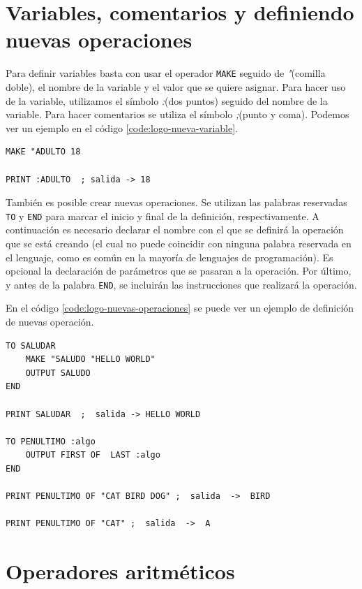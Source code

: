 \section{Variables, comentarios y definiendo nuevas operaciones}
\label{sec:logo-variables}

Para definir variables basta con usar el operador \texttt{MAKE} seguido de \emph{"}(comilla doble), el nombre de la variable y el valor que se quiere asignar. Para hacer uso de la variable, utilizamos el símbolo \emph{:}(dos puntos) seguido del nombre de la variable. Para hacer comentarios se utiliza el símbolo \emph{;}(punto y coma). Podemos ver un ejemplo en el código \ref{code:logo-nueva-variable}.

\begin{lstlisting}[language={Logo}, label={code:logo-nueva-variable}, caption={Ejemplo de definición de nuevas variables en el lenguaje Logo.}]
MAKE "ADULTO 18

PRINT :ADULTO  ; salida -> 18
\end{lstlisting}

También es posible crear nuevas operaciones. Se utilizan las palabras reservadas \texttt{TO} y \texttt{END} para marcar el inicio y final de la definición, respectivamente. A continuación es necesario declarar el nombre con el que se definirá la operación que se está creando (el cual no puede coincidir con ninguna palabra reservada en el lenguaje, como es común en la mayoría de lenguajes de programación). Es opcional la declaración de parámetros que se pasaran a la operación. Por último, y antes de la palabra \texttt{END}, se incluirán las instrucciones que realizará la operación.

En el código \ref{code:logo-nuevas-operaciones} se puede ver un ejemplo de definición de nuevas operación.

\begin{lstlisting}[language={Logo}, label={code:logo-nuevas-operaciones}, caption={Definición de nuevas operaciones en el lenguaje Logo.}]
TO SALUDAR
	MAKE "SALUDO "HELLO WORLD"
	OUTPUT SALUDO
END

PRINT SALUDAR  ;  salida -> HELLO WORLD

TO PENULTIMO :algo
	OUTPUT FIRST OF  LAST :algo
END

PRINT PENULTIMO OF "CAT BIRD DOG" ;  salida  ->  BIRD

PRINT PENULTIMO OF "CAT" ;  salida  ->  A
\end{lstlisting}


\section{Operadores aritméticos}

